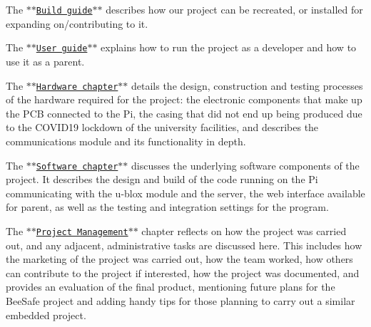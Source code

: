 \begin{DoxyItemize}
\item The $\ast$$\ast$\href{https://github.com/itsBelinda/ENG5220-2020-Team13/wiki/Build-Guide}{\tt Build guide}$\ast$$\ast$ describes how our project can be recreated, or installed for expanding on/contributing to it.
\item The $\ast$$\ast$\href{https://github.com/itsBelinda/ENG5220-2020-Team13/wiki/User-Guide}{\tt User guide}$\ast$$\ast$ explains how to run the project as a developer and how to use it as a parent.
\item The $\ast$$\ast$\href{https://github.com/itsBelinda/ENG5220-2020-Team13/wiki/Hardware}{\tt Hardware chapter}$\ast$$\ast$ details the design, construction and testing processes of the hardware required for the project\+: the electronic components that make up the P\+CB connected to the Pi, the casing that did not end up being produced due to the C\+O\+V\+I\+D19 lockdown of the university facilities, and describes the communications module and its functionality in depth.
\item The $\ast$$\ast$\href{https://github.com/itsBelinda/ENG5220-2020-Team13/wiki/Software}{\tt Software chapter}$\ast$$\ast$ discusses the underlying software components of the project. It describes the design and build of the code running on the Pi communicating with the u-\/blox module and the server, the web interface available for parent, as well as the testing and integration settings for the program.
\item The $\ast$$\ast$\href{https://github.com/itsBelinda/ENG5220-2020-Team13/wiki/Project-Management}{\tt Project Management}$\ast$$\ast$ chapter reflects on how the project was carried out, and any adjacent, administrative tasks are discussed here. This includes how the marketing of the project was carried out, how the team worked, how others can contribute to the project if interested, how the project was documented, and provides an evaluation of the final product, mentioning future plans for the Bee\+Safe project and adding handy tips for those planning to carry out a similar embedded project. ~\newline
 
\end{DoxyItemize}